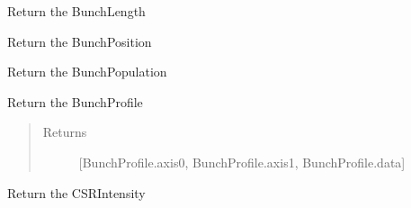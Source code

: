\documentclass[letterpaper,10pt,openany,oneside,english]{sphinxmanual}
\begin{document}
\begin{fulllineitems}
\begin{fulllineitems}
\end{fulllineitems}


\begin{fulllineitems}
\label{\detokenize{file:file.File_dep.bunch_length}}
Return the BunchLength

\end{fulllineitems}


\begin{fulllineitems}
\label{\detokenize{file:file.File_dep.bunch_position}}
Return the BunchPosition

\end{fulllineitems}


\begin{fulllineitems}
\label{\detokenize{file:file.File_dep.bunch_population}}
Return the BunchPopulation

\end{fulllineitems}


\begin{fulllineitems}
\label{\detokenize{file:file.File_dep.bunch_profile}}
Return the BunchProfile
\begin{quote}\begin{description}
\item[{Returns}] \leavevmode
{[}BunchProfile.axis0, BunchProfile.axis1, BunchProfile.data{]}

\end{description}\end{quote}

\end{fulllineitems}


\begin{fulllineitems}
\label{\detokenize{file:file.File_dep.csr_intensity}}
Return the CSRIntensity


\end{fulllineitems}
\end{fulllineitems}
\end{document}

